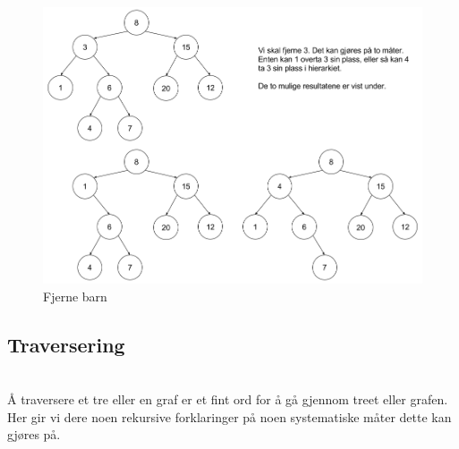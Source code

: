 \begin{figure}[H]
\includegraphics[scale=0.45]{images/fjernebarn}
\centering %
\caption{Fjerne barn}
\label{fig:fjernebarn}
\end{figure}

\subsection{Traversering}\\
Å traversere et tre eller en graf er et fint ord for å gå gjennom treet eller grafen. Her gir vi dere noen rekursive forklaringer på noen systematiske måter dette kan gjøres på.

